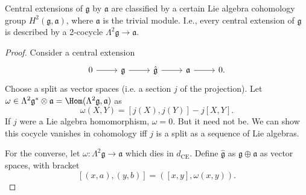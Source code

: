 \begin{claim}
	Central extensions  of $\mathfrak{g} $ by $\mathfrak{a} $ are classified by a certain Lie algebra cohomology group $H^2(\mathfrak{g} ,\mathfrak{a} )$, where $\mathfrak{a} $ is the trivial module. I.e., every central extension of $\mathfrak{g} $ is described by a 2-cocycle $\Lambda ^2\mathfrak{g} \to \mathfrak{a} $.
\end{claim}
\begin{proof}
	Consider a central extension
	\[\begin{tikzcd}[row sep = 2.5em, column sep = 2.5em]
		0\ar[r]  & \mathfrak{g} \ar[r]  & \hat{\mathfrak{g} }\ar[r]  & \mathfrak{a} \ar[r]  & 0.
	\end{tikzcd}\]
	Choose a split as vector spaces (i.e. a section $j$ of the projection). Let $\omega \in \Lambda ^2\mathfrak{g} ^*\otimes \mathfrak{a} =\Hom(\Lambda ^2\mathfrak{g} , \mathfrak{a} )$ as
	\[
		\omega (X,Y)=[j(X),j(Y)]-j[X,Y]
	.\]
	If $j$ were a Lie algebra homomorphism, $\omega =0$. But it need not be. We can show this cocycle vanishes in cohomology iff $j$ is a split as a sequence of Lie algebras.

	For the converse, let $\omega : \Lambda ^2\mathfrak{g}  \to \mathfrak{a} $ which dies in $d_{\mathrm{CE} } $. Define $\hat{\mathfrak{g} }$ as $\mathfrak{g} \oplus \mathfrak{a} $ as vector spaces, with bracket
	\[
		[(x,a),(y,b)]=([x,y],\omega (x,y))
	.\]
\end{proof}

